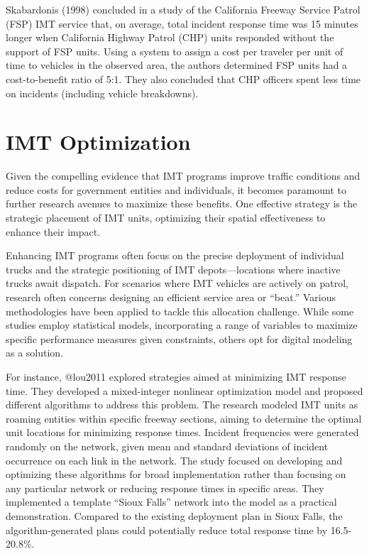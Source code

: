 \documentclass[
  letterpaper,
  DIV=11,
  numbers=noendperiod]{scrreprt}
\begin{document}
Skabardonis (1998) concluded in a study of the California Freeway
Service Patrol (FSP) IMT service that, on average, total incident
response time was 15 minutes longer when California Highway Patrol (CHP)
units responded without the support of FSP units. Using a system to
assign a cost per traveler per unit of time to vehicles in the observed
area, the authors determined FSP units had a cost-to-benefit ratio of
5:1. They also concluded that CHP officers spent less time on incidents
(including vehicle breakdowns).~

\hypertarget{imt-optimization}{%
\section{IMT Optimization}\label{imt-optimization}}

Given the compelling evidence that IMT programs improve traffic
conditions and reduce costs for government entities and individuals, it
becomes paramount to further research avenues to maximize these
benefits. One effective strategy is the strategic placement of IMT
units, optimizing their spatial effectiveness to enhance their impact.

Enhancing IMT programs often focus on the precise deployment of
individual trucks and the strategic positioning of IMT
depots---locations where inactive trucks await dispatch. For scenarios
where IMT vehicles are actively on patrol, research often concerns
designing an efficient service area or ``beat.'' Various methodologies
have been applied to tackle this allocation challenge. While some
studies employ statistical models, incorporating a range of variables to
maximize specific performance measures given constraints, others opt for
digital modeling as a solution.

For instance, @lou2011 explored strategies aimed at minimizing IMT
response time. They developed a mixed-integer nonlinear optimization
model and proposed different algorithms to address this problem. The
research modeled IMT units as roaming entities within specific freeway
sections, aiming to determine the optimal unit locations for minimizing
response times. Incident frequencies were generated randomly on the
network, given mean and standard deviations of incident occurrence on
each link in the network. The study focused on developing and optimizing
these algorithms for broad implementation rather than focusing on any
particular network or reducing response times in specific areas. They
implemented a template ``Sioux Falls'' network into the model as a
practical demonstration. Compared to the existing deployment plan in
Sioux Falls, the algorithm-generated plans could potentially reduce
total response time by 16.5-20.8\%.
\end{document}
